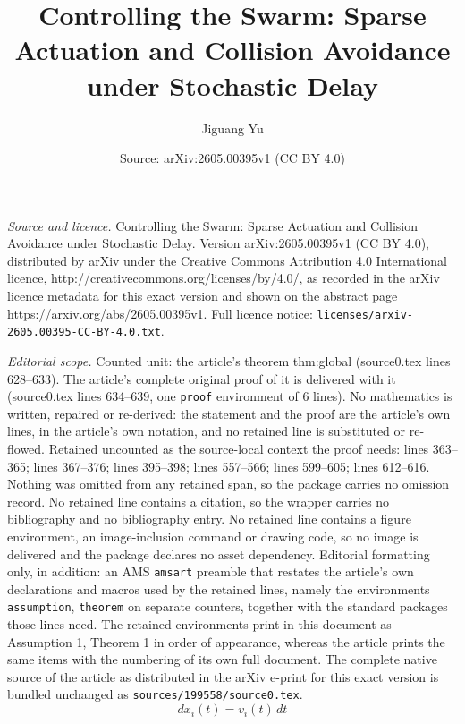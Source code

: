 \documentclass[10pt,a4paper]{amsart}
\title{Controlling the Swarm: Sparse Actuation and Collision Avoidance under Stochastic Delay}
\author{Jiguang Yu}
\date{Source: arXiv:2605.00395v1 (CC BY 4.0)}
\begin{document}
\maketitle

\noindent\emph{Source and licence.} Controlling the Swarm: Sparse Actuation and Collision Avoidance under Stochastic Delay. Version arXiv:2605.00395v1 (CC BY 4.0), distributed by arXiv under the Creative Commons Attribution 4.0 International licence, http://creativecommons.org/licenses/by/4.0/, as recorded in the arXiv licence metadata for this exact version and shown on the abstract page https://arxiv.org/abs/2605.00395v1. Full licence notice: \texttt{licenses/arxiv-2605.00395-CC-BY-4.0.txt}.\par\smallskip

\noindent\textit{Editorial scope.} Counted unit: the article's theorem thm:global (source0.tex lines 628--633). The article's complete original proof of it is delivered with it (source0.tex lines 634--639, one \texttt{proof} environment of 6 lines). No mathematics is written, repaired or re-derived: the statement and the proof are the article's own lines, in the article's own notation, and no retained line is substituted or re-flowed.  Retained uncounted as the source-local context the proof needs: lines 363--365; lines 367--376; lines 395--398; lines 557--566; lines 599--605; lines 612--616.  Nothing was omitted from any retained span, so the package carries no omission record.  No retained line contains a citation, so the wrapper carries no bibliography and no bibliography entry.  No retained line contains a figure environment, an image-inclusion command or drawing code, so no image is delivered and the package declares no asset dependency.  Editorial formatting only, in addition: an AMS \texttt{amsart} preamble that restates the article's own declarations and macros used by the retained lines, namely the environments \texttt{assumption}, \texttt{theorem} on separate counters, together with the standard packages those lines need.  The retained environments print in this document as Assumption 1, Theorem 1 in order of appearance, whereas the article prints the same items with the numbering of its own full document.  The complete native source of the article as distributed in the arXiv e-print for this exact version is bundled unchanged as \texttt{sources/199558/source0.tex}.
\begin{equation}\label{eq:pos}
  dx_i(t)=v_i(t)\,dt
\end{equation}
\end{document}
